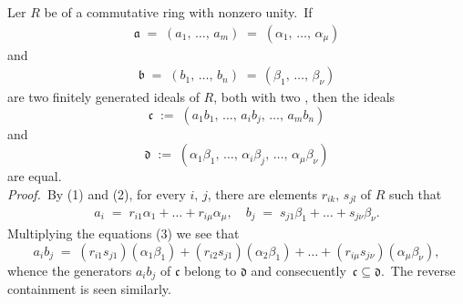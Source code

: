 \documentclass[12pt]{article}
\theoremstyle{definition}
\begin{document}
Ler $R$ be of a commutative ring with nonzero unity.\, If
\begin{align}
\mathfrak{a} \;=\; (a_1,\,\ldots,\,a_m) \;=\; (\alpha_1,\,\ldots,\,\alpha_\mu)
\end{align}
and
\begin{align}
\mathfrak{b} \;=\; (b_1,\,\ldots,\,b_n) \;=\, (\beta_1,\,\ldots,\,\beta_\nu)
\end{align}
are two finitely generated ideals of $R$, both with two , then the ideals
$$\mathfrak{c} \;:=\; (a_1b_1,\,\ldots,\,a_ib_j,\,\ldots,\,a_mb_n)$$
and
$$\mathfrak{d} \;:=\; (\alpha_1\beta_1,\,\ldots,\,\alpha_i\beta_j,\,\ldots,\,\alpha_\mu\beta_\nu)$$
are equal.\\


\emph{Proof.}\, By (1) and (2), for every $i,\,j$, there are elements $r_{ik},\,s_{jl}$ of $R$ such that
\begin{align}
a_i \;=\; r_{i1}\alpha_1\!+\ldots+r_{i\mu}\alpha_\mu, \quad b_j \;=\; s_{j1}\beta_1\!+\ldots+s_{j\nu}\beta_\nu.
\end{align}
Multiplying the equations (3) we see that
$$a_ib_j \;=\; 
(r_{i1}s_{j1})(\alpha_1\beta_1)\!+\!(r_{i2}s_{j1})(\alpha_2\beta_1)\!+\ldots+\!(r_{i\mu}s_{j\nu})(\alpha_\mu\beta_\nu),$$
whence the generators $a_ib_j$ of $\mathfrak{c}$ belong to $\mathfrak{d}$ and consecuently\, 
$\mathfrak{c} \subseteq \mathfrak{d}$.\, The reverse containment is seen similarly.

\end{document}

